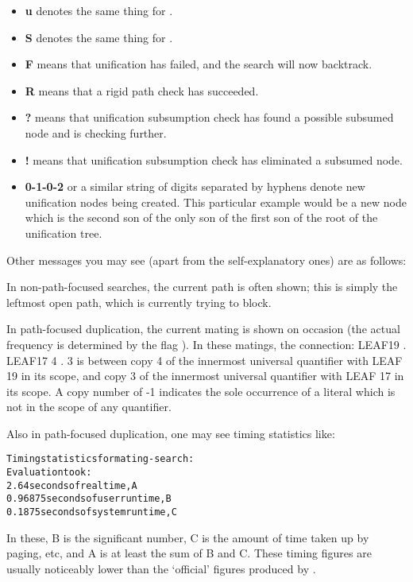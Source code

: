 \begin{itemize}
\item {\bf u} denotes the same thing for .

\item {\bf S} denotes the same thing for .

\item {\bf F} means that unification has failed, and the search will now backtrack.

\item {\bf R} means that a rigid path check has succeeded.

\item {\bf ?} means that unification subsumption check has found a possible subsumed node and is checking further.

\item {\bf !} means that unification subsumption check has eliminated a subsumed node.

\item {\bf 0-1-0-2} or a similar string of digits separated by hyphens denote new unification
nodes being created. This particular example would be a new node which is the second son of the
only son of the first son of the root of the unification tree.
\end{itemize}

Other messages you may see (apart from the self-explanatory ones) are as follows:

In non-path-focused searches, the current path is often shown; this is simply the
leftmost open path, which {\TPS} is currently trying to block.

In path-focused duplication, the current mating is shown on occasion (the
actual frequency is determined by the flag ).
In these matings, the connection: LEAF19 . LEAF17    4 . 3
is between copy 4 of the innermost universal quantifier with LEAF 19 in its scope,
and copy 3 of the innermost universal quantifier with LEAF 17 in its scope.
A copy number of -1 indicates the sole occurrence of a literal which is not
in the scope of any quantifier.

Also in path-focused duplication, one may see timing statistics like:
\begin{alltt}
Timing statistics for mating-search:
Evaluation took:
  2.64 seconds of real time,			A
  0.96875 seconds of user run time,		B
  0.1875 seconds of system run time,		C
\end{alltt}
In these, B is the significant number, C is the amount of time taken up by paging,
etc, and A is at least the sum of B and C. These timing figures are usually
noticeably lower than the `official' figures produced by
.

